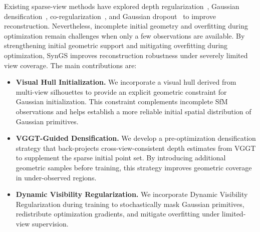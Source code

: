 Existing sparse-view methods have explored depth regularization~\cite{Li24_DNGaussian}, Gaussian densification~\cite{Zhu24_FSGS}, co-regularization~\cite{Zhang24_CoRGS}, and Gaussian dropout~\cite{Park25_DropGaussian} to improve reconstruction. Nevertheless, incomplete initial geometry and overfitting during optimization remain challenges when only a few observations are available.  By strengthening initial geometric support and mitigating overfitting during optimization, SynGS improves reconstruction robustness under severely limited view coverage.
The main contributions are:
\begin{itemize}
\item \textbf{Visual Hull Initialization.} We incorporate a visual hull derived from multi-view silhouettes to provide an explicit geometric constraint for Gaussian initialization. This constraint complements incomplete SfM observations and helps establish a more reliable initial spatial distribution of Gaussian primitives.
\item \textbf{VGGT-Guided Densification.} We develop a pre-optimization densification strategy that back-projects cross-view-consistent depth estimates from VGGT to supplement the sparse initial point set. By introducing additional geometric samples before training, this strategy improves geometric coverage in under-observed regions.
\item \textbf{Dynamic Visibility Regularization.} We incorporate Dynamic Visibility Regularization during training to stochastically mask Gaussian primitives, redistribute optimization gradients, and mitigate overfitting under limited-view supervision. 
\end{itemize}
